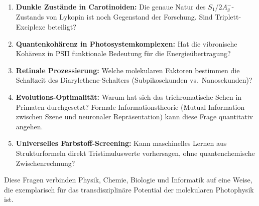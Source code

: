 ﻿\documentclass[a4paper,12pt]{article}
\theoremstyle{definition}
\begin{document}
\begin{enumerate}
  \item \textbf{Dunkle Zustände in Carotinoiden:} Die genaue Natur des $S_1$/$2A_g^-$-Zustands
        von Lykopin ist noch Gegenstand der Forschung. Sind Triplett-Exciplexe beteiligt?
  \item \textbf{Quantenkohärenz in Photosystemkomplexen:} Hat die vibronische Kohärenz
        in PSII funktionale Bedeutung für die Energieübertragung?
  \item \textbf{Retinale Prozessierung:} Welche molekularen Faktoren bestimmen die
        Schaltzeit des Diarylethene-Schalters (Subpikosekunden vs.\ Nanosekunden)?
  \item \textbf{Evolutions-Optimalität:} Warum hat sich das trichromatische Sehen in
        Primaten durchgesetzt? Formale Informationstheorie (Mutual Information zwischen
        Szene und neuronaler Repräsentation) kann diese Frage quantitativ angehen.
  \item \textbf{Universelles Farbstoff-Screening:} Kann maschinelles Lernen aus
        Strukturformeln direkt Tristimuluswerte vorhersagen, ohne quantenchemische
        Zwischenrechnung?
\end{enumerate}

Diese Fragen verbinden Physik, Chemie, Biologie und Informatik auf eine Weise,
die exemplarisch für das transdisziplinäre Potential der molekularen Photophysik ist.
\end{document}
